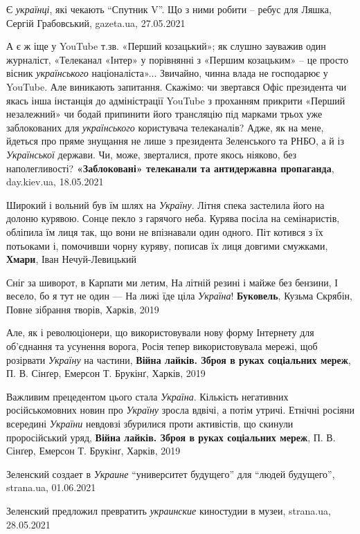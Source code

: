 Є \emph{українці}, які чекають \enquote{Спутник V}. Що з ними робити – ребус
для Ляшка, Сергій Грабовський, gazeta.ua, 27.05.2021

А є ж іще у YouTube т.зв. «Перший козацький»; як слушно зауважив один
журналіст, «Телеканал «Інтер» у порівнянні з «Першим козацьким» – це просто
вісник \emph{українського} націоналіста»... Звичайно, чинна влада не господарює у
YouTube. Але виникають запитання. Скажімо: чи звертався Офіс президента чи
якась інша інстанція до адміністрації YouTube з проханням прикрити «Перший
незалежний» чи бодай припинити його трансляцію під марками трьох уже
заблокованих для \emph{українського} користувача телеканалів? Адже, як на мене,
йдеться про пряме знущання не лише з президента Зеленського та РНБО, а й із
\emph{Української} держави. Чи, може, зверталися, проте якось ніяково, без
наполегливості? \textbf{«Заблоковані» телеканали та антидержавна пропаганда}, day.kiev.ua, 18.05.2021

Широкий і вольний був їм шлях на \emph{Україну}. Літня спека застелила його на
долоню курявою. Сонце пекло з гарячого неба. Курява посіла на семінаристів,
обліпила їм лиця так, що вони не впізнавали один одного. Піт котився з їх
потьоками і, помочивши чорну куряву, пописав їх лиця довгими смужками,
\textbf{Хмари}, Іван Нечуй-Левицький

Сніг за шиворот, в Карпати ми летим, На літній резині і майже без бензини, І
весело, бо я тут не один — На лижі їде ціла \emph{Україна}!  \textbf{Буковель},
Кузьма Скрябін, Повне зібрання творів, Харків, 2019

Але, як і революціонери, що використовували нову форму Інтернету для об'єднання
та усунення ворога, Росія тепер використовувала мережі, щоб розірвати
\emph{Україну} на частини, \textbf{Війна лайків. Зброя в руках соціальних
мереж}, П. В.  Сінґер, Емерсон Т. Брукінґ, Харків, 2019

Важливим прецедентом цього стала \emph{Україна}. Кількість негативних
російськомовних новин про \emph{Україну} зросла вдвічі, а потім утричі. Етнічні
росіяни всередині \emph{України} невдовзі збурилися проти активістів, що
скинули проросійський уряд, \textbf{Війна лайків. Зброя в руках соціальних
мереж}, П. В. Сінґер, Емерсон Т. Брукінґ, Харків, 2019

Зеленский создает в \emph{Украине} \enquote{университет будущего} для \enquote{людей
будущего}, strana.ua, 01.06.2021

Зеленский предложил превратить \emph{украинские} киностудии в музеи, strana.ua,
28.05.2021

